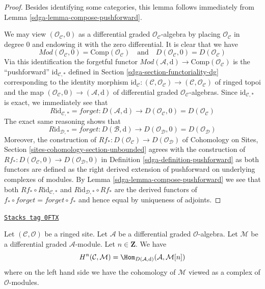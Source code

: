 \begin{proof}

Besides identifying some categories, this lemma follows immediately
from Lemma \ref{sdga-lemma-compose-pushforward}.

\medskip\noindent
We may view $(\mathcal{O}_\mathcal{C}, 0)$ as a differential graded
$\mathcal{O}_\mathcal{C}$-algebra by placing $\mathcal{O}_\mathcal{C}$
in degree $0$ and endowing it with the zero differential. It is clear
that we have
$$
\textit{Mod}(\mathcal{O}_\mathcal{C}, 0) =
\text{Comp}(\mathcal{O}_\mathcal{C})
\quad\text{and}\quad
D(\mathcal{O}_\mathcal{C}, 0) = D(\mathcal{O}_\mathcal{C})
$$
Via this identification the forgetful functor
$\textit{Mod}(\mathcal{A}, \text{d}) \to
\text{Comp}(\mathcal{O}_\mathcal{C})$
is the ``pushforward'' $\text{id}_{\mathcal{C}, *}$
defined in Section \ref{sdga-section-functoriality-dg}
corresponding to the identity morphism
$\text{id}_\mathcal{C} : (\mathcal{C}, \mathcal{O}_\mathcal{C}) \to
(\mathcal{C}, \mathcal{O}_\mathcal{C})$ of ringed topoi and the
map $(\mathcal{O}_\mathcal{C}, 0) \to (\mathcal{A}, \text{d})$
of differential graded $\mathcal{O}_\mathcal{C}$-algebras.
Since $\text{id}_{\mathcal{C}, *}$ is exact, we immediately see that
$$
R\text{id}_{\mathcal{C}, *} = forget :
D(\mathcal{A}, \text{d}) \longrightarrow
D(\mathcal{O}_\mathcal{C}, 0) = D(\mathcal{O}_\mathcal{C})
$$
The exact same reasoning shows that
$$
R\text{id}_{\mathcal{D}, *} = forget :
D(\mathcal{B}, \text{d}) \longrightarrow
D(\mathcal{O}_\mathcal{D}, 0) = D(\mathcal{O}_\mathcal{D})
$$
Moreover, the construction of
$Rf_* : D(\mathcal{O}_\mathcal{C}) \to D(\mathcal{O}_\mathcal{D})$
of Cohomology on Sites, Section \ref{sites-cohomology-section-unbounded}
agrees with the construction of
$Rf_* : D(\mathcal{O}_\mathcal{C}, 0) \to D(\mathcal{O}_\mathcal{D}, 0)$
in Definition \ref{sdga-definition-pushforward}
as both functors are defined as the right derived extension of
pushforward on underlying complexes of modules.
By Lemma \ref{sdga-lemma-compose-pushforward} we see that both
$Rf_* \circ R\text{id}_{\mathcal{C}, *}$ and
$R\text{id}_{\mathcal{D}, *} \circ Rf_*$ are the derived functors
of $f_* \circ forget = forget \circ f_*$ and hence equal
by uniqueness of adjoints.
\end{proof}

\begin{lemma}
\label{sdga-lemma-cohomology-ext}
\href{https://stacks.math.columbia.edu/tag/0FTX}{\texttt{Stacks tag 0FTX}}

Let $(\mathcal{C}, \mathcal{O})$ be a ringed site.
Let $\mathcal{A}$ be a differential graded $\mathcal{O}$-algebra.
Let $\mathcal{M}$ be a differential graded $\mathcal{A}$-module.
Let $n \in \mathbf{Z}$. We have
$$
H^n(\mathcal{C}, \mathcal{M}) =
\Hom_{D(\mathcal{A}, \text{d})}(\mathcal{A}, \mathcal{M}[n])
$$
where on the left hand side we have the cohomology of $\mathcal{M}$
viewed as a complex of $\mathcal{O}$-modules.
\end{lemma}

